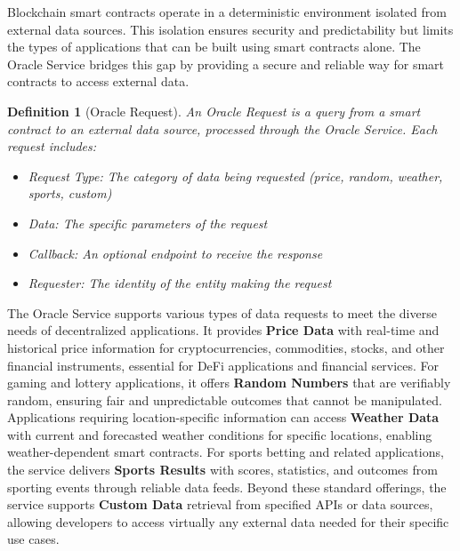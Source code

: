 \documentclass[11pt]{article}
\newtheorem{definition}{Definition}
\begin{document}
Blockchain smart contracts operate in a deterministic environment isolated from external data sources. This isolation ensures security and predictability but limits the types of applications that can be built using smart contracts alone. The Oracle Service bridges this gap by providing a secure and reliable way for smart contracts to access external data.



\begin{definition}[Oracle Request]
An Oracle Request is a query from a smart contract to an external data source, processed through the Oracle Service. Each request includes:
\begin{itemize}
    \item Request Type: The category of data being requested (price, random, weather, sports, custom)
    \item Data: The specific parameters of the request
    \item Callback: An optional endpoint to receive the response
    \item Requester: The identity of the entity making the request
\end{itemize}
\end{definition}

The Oracle Service supports various types of data requests to meet the diverse needs of decentralized applications. It provides \textbf{Price Data} with real-time and historical price information for cryptocurrencies, commodities, stocks, and other financial instruments, essential for DeFi applications and financial services. For gaming and lottery applications, it offers \textbf{Random Numbers} that are verifiably random, ensuring fair and unpredictable outcomes that cannot be manipulated. Applications requiring location-specific information can access \textbf{Weather Data} with current and forecasted weather conditions for specific locations, enabling weather-dependent smart contracts. For sports betting and related applications, the service delivers \textbf{Sports Results} with scores, statistics, and outcomes from sporting events through reliable data feeds. Beyond these standard offerings, the service supports \textbf{Custom Data} retrieval from specified APIs or data sources, allowing developers to access virtually any external data needed for their specific use cases.
\end{document}
